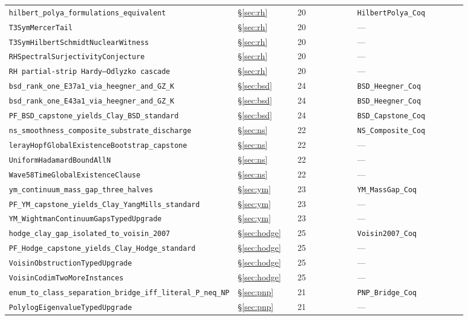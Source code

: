 \documentclass[11pt,a4paper]{article}
\theoremstyle{definition}
\theoremstyle{remark}
\newcommand{\lean}[1]{\texttt{\small #1}}
\begin{document}
\begin{longtable}{p{0.40\linewidth} p{0.13\linewidth} p{0.13\linewidth} p{0.24\linewidth}}
\lean{hilbert\_polya\_formulations\_equivalent} & \S\ref{sec:rh} & 20 & \lean{HilbertPolya\_Coq} \\
\lean{T3SymMercerTail} & \S\ref{sec:rh} & 20 & --- \\
\lean{T3SymHilbertSchmidtNuclearWitness} & \S\ref{sec:rh} & 20 & --- \\
\lean{RHSpectralSurjectivityConjecture} & \S\ref{sec:rh} & 20 & --- \\
\lean{RH partial-strip Hardy--Odlyzko cascade} & \S\ref{sec:rh} & 20 & --- \\
\lean{bsd\_rank\_one\_E37a1\_via\_heegner\_and\_GZ\_K} & \S\ref{sec:bsd} & 24 & \lean{BSD\_Heegner\_Coq} \\
\lean{bsd\_rank\_one\_E43a1\_via\_heegner\_and\_GZ\_K} & \S\ref{sec:bsd} & 24 & \lean{BSD\_Heegner\_Coq} \\
\lean{PF\_BSD\_capstone\_yields\_Clay\_BSD\_standard} & \S\ref{sec:bsd} & 24 & \lean{BSD\_Capstone\_Coq} \\
\lean{ns\_smoothness\_composite\_substrate\_discharge} & \S\ref{sec:ns} & 22 & \lean{NS\_Composite\_Coq} \\
\lean{lerayHopfGlobalExistenceBootstrap\_capstone} & \S\ref{sec:ns} & 22 & --- \\
\lean{UniformHadamardBoundAllN} & \S\ref{sec:ns} & 22 & --- \\
\lean{Wave58TimeGlobalExistenceClause} & \S\ref{sec:ns} & 22 & --- \\
\lean{ym\_continuum\_mass\_gap\_three\_halves} & \S\ref{sec:ym} & 23 & \lean{YM\_MassGap\_Coq} \\
\lean{PF\_YM\_capstone\_yields\_Clay\_YangMills\_standard} & \S\ref{sec:ym} & 23 & --- \\
\lean{YM\_WightmanContinuumGapsTypedUpgrade} & \S\ref{sec:ym} & 23 & --- \\
\lean{hodge\_clay\_gap\_isolated\_to\_voisin\_2007} & \S\ref{sec:hodge} & 25 & \lean{Voisin2007\_Coq} \\
\lean{PF\_Hodge\_capstone\_yields\_Clay\_Hodge\_standard} & \S\ref{sec:hodge} & 25 & --- \\
\lean{VoisinObstructionTypedUpgrade} & \S\ref{sec:hodge} & 25 & --- \\
\lean{VoisinCodimTwoMoreInstances} & \S\ref{sec:hodge} & 25 & --- \\
\lean{enum\_to\_class\_separation\_bridge\_iff\_literal\_P\_neq\_NP} & \S\ref{sec:pnp} & 21 & \lean{PNP\_Bridge\_Coq} \\
\lean{PolylogEigenvalueTypedUpgrade} & \S\ref{sec:pnp} & 21 & --- \\

\end{longtable}
\end{document}
